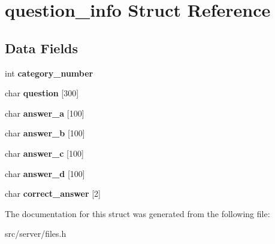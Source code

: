 \hypertarget{structquestion__info}{}\section{question\+\_\+info Struct Reference}
\label{structquestion__info}
\subsection*{Data Fields}
\begin{DoxyCompactItemize}
\item 
\mbox{\label{structquestion__info_ac20eb53a28341d5467c46ef17cd4a27c}} 
int {\bfseries category\+\_\+number}
\item 
\mbox{\label{structquestion__info_afe079ccc972a5fca49d2ddf10f8abc42}} 
char {\bfseries question} \mbox{[}300\mbox{]}
\item 
\mbox{\label{structquestion__info_ad373b1e4c813227674e88edd5ba2d2b6}} 
char {\bfseries answer\+\_\+a} \mbox{[}100\mbox{]}
\item 
\mbox{\label{structquestion__info_aaf91d52af07b467db57a5bb9cb2a6288}} 
char {\bfseries answer\+\_\+b} \mbox{[}100\mbox{]}
\item 
\mbox{\label{structquestion__info_accaa05f04a0773d7525210b64a398d3a}} 
char {\bfseries answer\+\_\+c} \mbox{[}100\mbox{]}
\item 
\mbox{\label{structquestion__info_ad9d2653829450d181a667d2829817a2c}} 
char {\bfseries answer\+\_\+d} \mbox{[}100\mbox{]}
\item 
\mbox{\label{structquestion__info_a1b631b638704a4c7b2e48239bf6879e1}} 
char {\bfseries correct\+\_\+answer} \mbox{[}2\mbox{]}
\end{DoxyCompactItemize}


The documentation for this struct was generated from the following file\+:\begin{DoxyCompactItemize}
\item 
src/server/files.\+h\end{DoxyCompactItemize}
